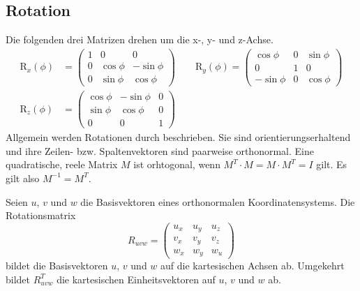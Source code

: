 \subsection{Rotation}
Die folgenden drei Matrizen drehen um die x-, y- und z-Achse.
\begin{align*}
  \mathrm{R}_x(\phi) &=
  \begin{pmatrix}
    1 & 0         & 0 \\
    0 & \cos \phi & -\sin \phi \\
    0 & \sin \phi & \cos \phi
  \end{pmatrix}
  \qquad
  \mathrm{R}_y(\phi) =
  \begin{pmatrix}
    \cos \phi  & 0 & \sin \phi \\
    0          & 1 & 0 \\
    -\sin \phi & 0 & \cos \phi
  \end{pmatrix} \\
  \mathrm{R}_z(\phi) &=
  \begin{pmatrix}
    \cos \phi  & -\sin \phi & 0 \\
    \sin \phi  & \cos \phi  & 0 \\
    0          & 0          & 1
  \end{pmatrix}
\end{align*}
Allgemein werden Rotationen durch  beschrieben.
Sie sind orientierungserhaltend und ihre Zeilen- bzw. Spaltenvektoren sind paarweise orthonormal.
Eine quadratische, reele Matrix $M$ ist orhtogonal, wenn $M^T \cdot M = M \cdot M^T = I$ gilt.
Es gilt also $M^{-1} = M^T$.

Seien $u$, $v$ und $w$ die Basisvektoren eines orthonormalen Koordinatensystems.
Die Rotationsmatrix
\[
  R_{uvw} = 
  \begin{pmatrix}
    u_x & u_y & u_z \\
    v_x & v_y & v_z \\
    w_x & w_y & w_u
  \end{pmatrix}
\]
bildet die Basisvektoren $u$, $v$ und $w$ auf die kartesischen Achsen ab.
Umgekehrt bildet $R_{uvw}^T$ die kartesischen Einheitsvektoren auf $u$, $v$ und $w$ ab.

